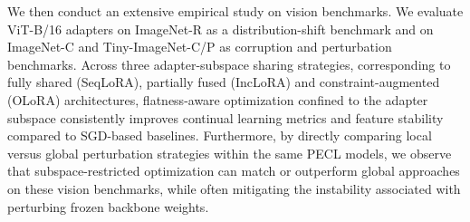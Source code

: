 \documentclass[10pt]{article} %
\begin{document}


We then conduct an extensive empirical study on vision benchmarks. We evaluate ViT-B/16 adapters on ImageNet-R as a distribution-shift benchmark and on ImageNet-C and Tiny-ImageNet-C/P as corruption and perturbation benchmarks. Across three adapter-subspace sharing strategies, corresponding to fully shared (SeqLoRA), partially fused (IncLoRA) and constraint-augmented (OLoRA) architectures, flatness-aware optimization confined to the adapter subspace consistently improves continual learning metrics and feature stability compared to SGD-based baselines. Furthermore, by directly comparing local versus global perturbation strategies within the same PECL models, we observe that subspace-restricted optimization can match or outperform global approaches on these vision benchmarks, while often mitigating the instability associated with perturbing frozen backbone weights.
\end{document}
